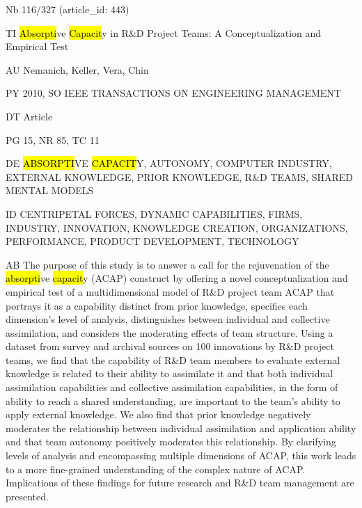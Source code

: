 \documentclass[a4paper]{article}
\begin{document}
\vspace*{-2cm}
Nb \tabto{0cm}116/327 (article\_id: 443)\par
TI \tabto{0cm}\hl{Absorpti}ve \hl{Capacit}y in R\&D Project Teams: A Conceptualization and Empirical Test\par
AU \tabto{0cm}Nemanich, Keller, Vera, Chin\par
PY \tabto{0cm}2010, SO IEEE TRANSACTIONS ON ENGINEERING MANAGEMENT\par
DT \tabto{0cm}Article\par
PG \tabto{0cm}15, NR 85, TC 11\par
DE \tabto{0cm}\hl{ABSORPTI}VE \hl{CAPACIT}Y, AUTONOMY, COMPUTER INDUSTRY, EXTERNAL KNOWLEDGE, PRIOR KNOWLEDGE, R\&D TEAMS, SHARED MENTAL MODELS\par
ID \tabto{0cm}CENTRIPETAL FORCES, DYNAMIC CAPABILITIES, FIRMS, INDUSTRY, INNOVATION, KNOWLEDGE CREATION, ORGANIZATIONS, PERFORMANCE, PRODUCT DEVELOPMENT, TECHNOLOGY\par
AB \tabto{0cm}The purpose of this study is to answer a call for the rejuvenation of the \hl{absorpti}ve \hl{capacit}y (ACAP) construct by offering a novel conceptualization and empirical test of a multidimensional model of R\&D project team ACAP that portrays it as a capability distinct from prior knowledge, specifies each dimension's level of analysis, distinguishes between individual and collective assimilation, and considers the moderating effects of team structure. Using a dataset from survey and archival sources on 100 innovations by R\&D project teams, we find that the capability of R\&D team members to evaluate external knowledge is related to their ability to assimilate it and that both individual assimilation capabilities and collective assimilation capabilities, in the form of ability to reach a shared understanding, are important to the team's ability to apply external knowledge. We also find that prior knowledge negatively moderates the relationship between individual assimilation and application ability and that team autonomy positively moderates this relationship. By clarifying levels of analysis and encompassing multiple dimensions of ACAP, this work leads to a more fine-grained understanding of the complex nature of ACAP. Implications of these findings for future research and R\&D team management are presented.\par
\clearpage
\end{document}
